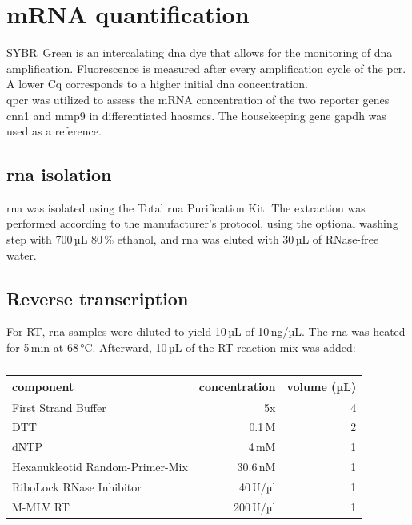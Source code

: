 \section{mRNA quantification}
\label{sec:qpcr}
SYBR\texttrademark~Green is an intercalating \ac{dna} dye that allows for the monitoring of \ac{dna} amplification. Fluorescence is measured after every amplification cycle of the \ac{pcr}. A lower \ac{Cq} corresponds to a higher initial \ac{dna} concentration. \cite{huggettStandardisationReportingNucleic2011}\\
\Ac{qpcr} was utilized to assess the \ac{mRNA} concentration of the two reporter genes \ac{cnn1} and \ac{mmp9} in differentiated \acp{haosmc}. The housekeeping gene \ac{gapdh} was used as a reference.


    \subsection{\ac{rna} isolation}
    \ac{rna} was isolated using the Total \ac{rna} Purification Kit. The extraction was performed according to the manufacturer's protocol, using the optional washing step with 700\,µL 80\,\% ethanol, and \ac{rna} was eluted with 30\,µL of RNase-free water.

    \subsection{Reverse transcription}
    For \ac{RT}, \ac{rna} samples were diluted to yield 10\,µL of 10\,ng/µL. The \ac{rna} was heated for 5\,min at 68\,°C. Afterward, 10\,µL of the \ac{RT} reaction mix was added:

    \begin{table}[h]
    \capstart
	\centering
	\begin{minipage}{\captionwidth}
	   	\caption[RT mastermix]{}
	   	\label{tab:RT Mastr Mix}
	\end{minipage}
    \begin{tabular}{|l|r|r|}
        \hline
        component               & concentration & volume (µL) \\ \hline
        First Strand Buffer     & 5x            & 4           \\
        \acs{DTT}               & 0.1\,M               & 2           \\
        \acs{dNTP}              & 4\,mM               & 1           \\
        Hexanukleotid Random-Primer-Mix  & 30.6\,nM               & 1           \\
        RiboLock RNase Inhibitor                & 40\,U/µl                & 1           \\
        M-MLV \acs{RT}                & 200\,U/µl               & 1           \\ \hline
    \end{tabular}
    \end{table}

